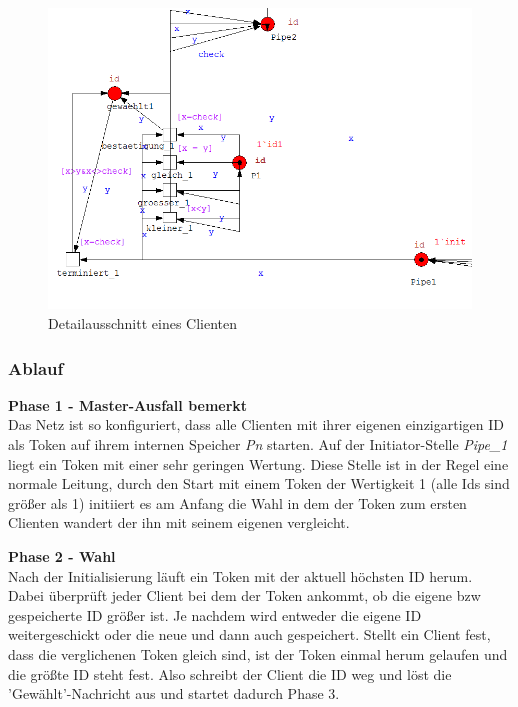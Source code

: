 \begin{figure}[H]
\centering
\includegraphics[width=1\linewidth]{kapitel/hauptteil/img/cpn_detail}
\caption{Detailausschnitt eines Clienten}
\label{fig:cpn_detail}
\end{figure}

\subsubsection{Ablauf}

\textbf{Phase 1 - Master-Ausfall bemerkt}\\
Das Netz ist so konfiguriert, dass alle Clienten mit ihrer eigenen einzigartigen ID als Token auf ihrem internen Speicher \textit{Pn} starten. Auf der Initiator-Stelle \textit{Pipe\_1} liegt ein Token mit einer sehr geringen Wertung. Diese Stelle ist in der Regel eine normale Leitung, durch den Start mit einem Token der Wertigkeit 1 (alle Ids sind größer als 1) initiiert es am Anfang die Wahl in dem der Token zum ersten Clienten wandert der ihn mit seinem eigenen vergleicht.	

\textbf{Phase 2 - Wahl}\\
Nach der Initialisierung läuft ein Token mit der aktuell höchsten ID herum. Dabei überprüft jeder Client bei dem der Token ankommt, ob die eigene bzw gespeicherte ID größer ist. Je nachdem wird entweder die eigene ID weitergeschickt oder die neue und dann auch gespeichert. Stellt ein Client fest, dass die verglichenen Token gleich sind, ist der Token einmal herum gelaufen und die größte ID steht fest. Also schreibt der Client die ID weg und löst die 'Gewählt'-Nachricht aus und startet dadurch Phase 3.

